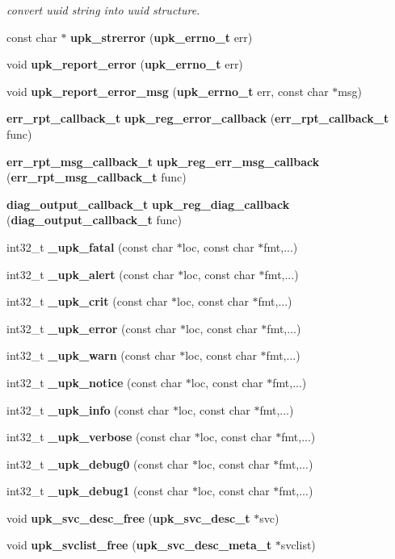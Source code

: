 \begin{DoxyCompactItemize}
\begin{DoxyCompactList}\small\item\em convert uuid string into uuid structure. \end{DoxyCompactList}\item 
const char $\ast$ {\bf upk\_\-strerror} ({\bf upk\_\-errno\_\-t} err)
\item 
void {\bf upk\_\-report\_\-error} ({\bf upk\_\-errno\_\-t} err)
\item 
void {\bf upk\_\-report\_\-error\_\-msg} ({\bf upk\_\-errno\_\-t} err, const char $\ast$msg)
\item 
{\bf err\_\-rpt\_\-callback\_\-t} {\bf upk\_\-reg\_\-error\_\-callback} ({\bf err\_\-rpt\_\-callback\_\-t} func)
\item 
{\bf err\_\-rpt\_\-msg\_\-callback\_\-t} {\bf upk\_\-reg\_\-err\_\-msg\_\-callback} ({\bf err\_\-rpt\_\-msg\_\-callback\_\-t} func)
\item 
{\bf diag\_\-output\_\-callback\_\-t} {\bf upk\_\-reg\_\-diag\_\-callback} ({\bf diag\_\-output\_\-callback\_\-t} func)
\item 
int32\_\-t {\bf \_\-upk\_\-fatal} (const char $\ast$loc, const char $\ast$fmt,...)
\item 
int32\_\-t {\bf \_\-upk\_\-alert} (const char $\ast$loc, const char $\ast$fmt,...)
\item 
int32\_\-t {\bf \_\-upk\_\-crit} (const char $\ast$loc, const char $\ast$fmt,...)
\item 
int32\_\-t {\bf \_\-upk\_\-error} (const char $\ast$loc, const char $\ast$fmt,...)
\item 
int32\_\-t {\bf \_\-upk\_\-warn} (const char $\ast$loc, const char $\ast$fmt,...)
\item 
int32\_\-t {\bf \_\-upk\_\-notice} (const char $\ast$loc, const char $\ast$fmt,...)
\item 
int32\_\-t {\bf \_\-upk\_\-info} (const char $\ast$loc, const char $\ast$fmt,...)
\item 
int32\_\-t {\bf \_\-upk\_\-verbose} (const char $\ast$loc, const char $\ast$fmt,...)
\item 
int32\_\-t {\bf \_\-upk\_\-debug0} (const char $\ast$loc, const char $\ast$fmt,...)
\item 
int32\_\-t {\bf \_\-upk\_\-debug1} (const char $\ast$loc, const char $\ast$fmt,...)
\item 
void {\bf upk\_\-svc\_\-desc\_\-free} ({\bf upk\_\-svc\_\-desc\_\-t} $\ast$svc)
\item 
void {\bf upk\_\-svclist\_\-free} ({\bf upk\_\-svc\_\-desc\_\-meta\_\-t} $\ast$svclist)

\end{DoxyCompactItemize}

